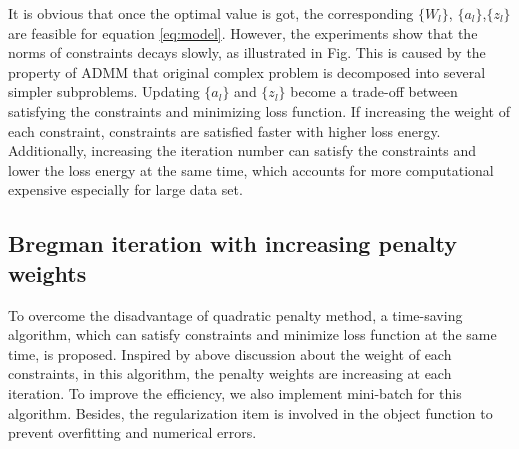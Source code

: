 \documentclass[letterpaper, 10 pt, conference]{ieeeconf}  %
\begin{document}
It is obvious that once the optimal value is got, the corresponding $\{W_l\}$, $\{a_l\}$,$\{z_l\}$ are feasible for equation \eqref{eq:model}. However, the experiments show that the norms of constraints decays slowly, as illustrated in Fig. This is caused by the property of ADMM that original complex problem is decomposed into several simpler subproblems. Updating $\{a_l\}$ and $\{z_l\}$ become a trade-off between satisfying the constraints and minimizing loss function. If increasing the weight of each constraint, constraints are satisfied faster with higher loss energy. Additionally, increasing the iteration number can satisfy the constraints and lower the loss energy at the same time, which accounts for more computational expensive especially for large data set.

\subsection{Bregman iteration with increasing penalty weights}
To overcome the disadvantage of quadratic penalty method, a time-saving algorithm, which can satisfy constraints and minimize loss function at the same time, is proposed. Inspired by above discussion about the weight of each constraints, in this algorithm, the penalty weights are increasing at each iteration. To improve the efficiency, we also implement mini-batch for this algorithm. Besides, the regularization item is involved in the object function to prevent overfitting and numerical errors.
\end{document}
